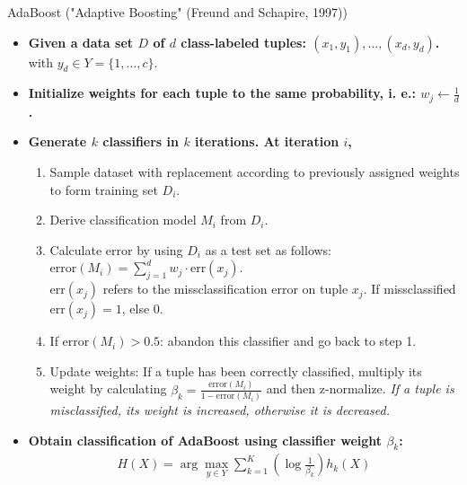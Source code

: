 \begin{frame}{AdaBoost ("Adaptive Boosting" (Freund and Schapire, 1997))}
	\begin{itemize}
		\item \textbf{Given a data set $D$ of $d$ class-labeled tuples: $(x_1 , y_1), \ldots, (x_d, y_d)$.} with $y_d \in Y = \{1, \dots, c\}$.
		\item \textbf{Initialize weights for each tuple to the same probability, i. e.: $w_j \leftarrow \frac{1}{d}$.}
		\item \textbf{Generate $k$ classifiers in $k$ iterations. At iteration $i$,}
		      \begin{enumerate}
			      \item Sample dataset with replacement according to previously assigned weights to form training set $D_i$.
			      \item Derive classification model $M_i$ from $D_i$.
			      \item Calculate error by using $D_i$ as a test set as follows: $\text{error}(M_i) = \sum_{j=1}^{d} w_j \cdot \text{err}(x_j)$.\\
			            $\text{err}(x_j)$ refers to the missclassification error on tuple $x_j$. If missclassified $\text{err}(x_j)=1$, else $0$.
			      \item If $\text{error}(M_i)>0.5$: abandon this classifier and go back to step 1.
			      \item Update weights: If a tuple has been correctly classified, multiply its weight by calculating $\beta_k = \frac{\text{error}(M_i)}{1-\text{error}(M_i)}$ and then z-normalize. \textit{If a tuple is misclassified, its weight is increased, otherwise it is decreased.}
		      \end{enumerate}
		\item \textbf{Obtain classification of AdaBoost using classifier weight $\beta_k$:}
		      \begin{align*}
			      \textstyle H(X)= \arg \max_{y\in Y} \sum_{k=1}^K (\log \frac{1}{\beta_k})h_k(X)
		      \end{align*}

	\end{itemize}
\end{frame}


